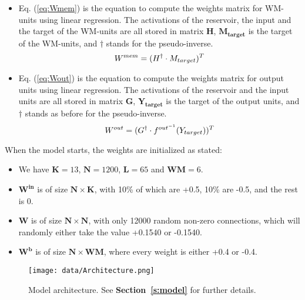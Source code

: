\begin{itemize}
    \item Eq. (\ref{eq:Wmem}) is the equation to compute the weights matrix for WM-units using linear regression. The activations of the reservoir, the input and the target of the WM-units are all stored in matrix $\mathbf{H}$, $\mathbf{M_{target}}$ is the target of the WM-units, and $\dagger$ stands for the pseudo-inverse.
    \begin{equation} \label{eq:Wmem}
        W^{mem} = (H^{\dagger} \cdot M_{target})^T\\
    \end{equation}

    \item Eq. (\ref{eq:Wout}) is the equation to compute the weights matrix for output units using linear regression. The activations of the reservoir and the input units are all stored in matrix $\mathbf{G}$, $\mathbf{Y_{target}}$ is the target of the output units, and $\dagger$ stands as before for the pseudo-inverse.
    \begin{equation} \label{eq:Wout}
        W^{out} = (G^{\dagger} \cdot f^{out^{-1}}(Y_{target}))^T\\
    \end{equation}

\end{itemize}

When the model starts, the weights are initialized as stated:
\begin{itemize}
    \item We have $\mathbf{K}=13$, $\mathbf{N}=1200$, $\mathbf{L}=65$ and $\mathbf{WM}=6$.
    \item $\mathbf{W^{in}}$ is of size $\mathbf{N \times K}$, with 10\% of which are +0.5, 10\% are -0.5, and the rest is 0.
    \item $\mathbf{W}$ is of size $\mathbf{N \times N}$, with only 12000 random non-zero connections, which will randomly either take the value +0.1540 or -0.1540.
    \item $\mathbf{W^{b}}$ is of size $\mathbf{N \times WM}$, where every weight is either +0.4 or -0.4.

\end{itemize}

\begin{figure}[h]
    \centering
    \texttt{[image: data/Architecture.png]}
    \caption{Model architecture. See \textbf{Section~\ref{s:model}} for further details.}
    \label{fig:architecture}
\end{figure}

